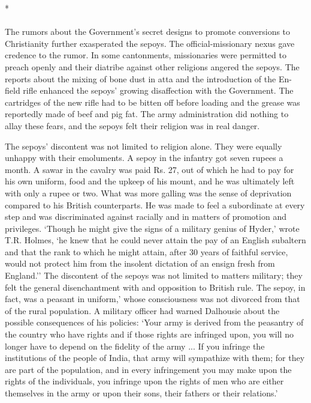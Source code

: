 \begin{multicols}{2}
\begin{center}*\end{center}

\paragraph*{}
The rumors about the Government's secret designs to promote conversions to Christianity further exasperated the sepoys. The official-missionary nexus gave credence to the rumor. In some cantonments, missionaries were permitted to preach openly and their diatribe against other religions angered the sepoys. The reports about the mixing of bone dust in atta and the introduction of the En-field rifle enhanced the sepoys' growing disaffection with the Government. The cartridges of the new rifle had to be bitten off before loading and the grease was reportedly made of beef and pig fat. The army administration did nothing to allay these fears, and the sepoys felt their religion was in real danger.

The sepoys' discontent was not limited to religion alone. They were equally unhappy with their emoluments. A sepoy in the infantry got seven rupees a month. A sawar in the cavalry was paid Rs. 27, out of which he had to pay for his own uniform, food and the upkeep of his mount, and he was ultimately left with only a rupee or two. What was more galling was the sense of deprivation compared to his British counterparts. He was made to feel a subordinate at every step and was discriminated against racially and in matters of promotion and privileges. `Though he might give the signs of a military genius of Hyder,' wrote T.R. Holmes, `he knew that he could never attain the pay of an English subaltern and that the rank to which he might attain, after 30 years of faithful service, would not protect him from the insolent dictation of an ensign fresh from England.'' The discontent of the sepoys was not limited to matters military; they felt the general disenchantment with and opposition to British rule. The sepoy, in fact, was a peasant in uniform,' whose consciousness was not divorced from that of the rural population. A military officer had warned Dalhousie about the possible consequences of his policies: `Your army is derived from the peasantry of the country who have rights and if those rights are infringed upon, you will no longer have to depend on the fidelity of the army ... If you infringe the institutions of the people of India, that army will sympathize with them; for they are part of the population, and in every infringement you may make upon the rights of the individuals, you infringe upon the rights of men who are either themselves in the army or upon their sons, their fathers or their relations.'


\end{multicols}
